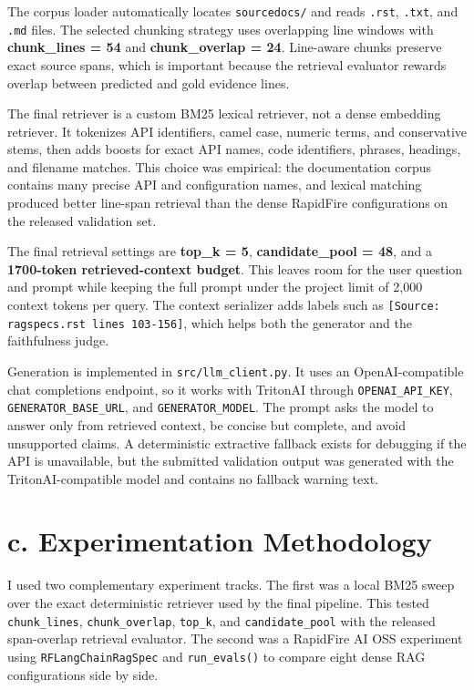\documentclass[11pt,twocolumn]{article}
\newcommand{\code}[1]{\texttt{\footnotesize #1}}
\newcommand{\metric}[1]{\textbf{#1}}
\begin{document}
The corpus loader automatically locates \code{sourcedocs/} and reads \code{.rst}, \code{.txt}, and \code{.md} files. The selected chunking strategy uses overlapping line windows with \metric{chunk\_lines = 54} and \metric{chunk\_overlap = 24}. Line-aware chunks preserve exact source spans, which is important because the retrieval evaluator rewards overlap between predicted and gold evidence lines.

The final retriever is a custom BM25 lexical retriever, not a dense embedding retriever. It tokenizes API identifiers, camel case, numeric terms, and conservative stems, then adds boosts for exact API names, code identifiers, phrases, headings, and filename matches. This choice was empirical: the documentation corpus contains many precise API and configuration names, and lexical matching produced better line-span retrieval than the dense RapidFire configurations on the released validation set.

The final retrieval settings are \metric{top\_k = 5}, \metric{candidate\_pool = 48}, and a \metric{1700-token retrieved-context budget}. This leaves room for the user question and prompt while keeping the full prompt under the project limit of 2,000 context tokens per query. The context serializer adds labels such as \code{[Source: ragspecs.rst lines 103-156]}, which helps both the generator and the faithfulness judge.

Generation is implemented in \code{src/llm\_client.py}. It uses an OpenAI-compatible chat completions endpoint, so it works with TritonAI through \code{OPENAI\_API\_KEY}, \code{GENERATOR\_BASE\_URL}, and \code{GENERATOR\_MODEL}. The prompt asks the model to answer only from retrieved context, be concise but complete, and avoid unsupported claims. A deterministic extractive fallback exists for debugging if the API is unavailable, but the submitted validation output was generated with the TritonAI-compatible model and contains no fallback warning text.

\section{c. Experimentation Methodology}

I used two complementary experiment tracks. The first was a local BM25 sweep over the exact deterministic retriever used by the final pipeline. This tested \code{chunk\_lines}, \code{chunk\_overlap}, \code{top\_k}, and \code{candidate\_pool} with the released span-overlap retrieval evaluator. The second was a RapidFire AI OSS experiment using \code{RFLangChainRagSpec} and \code{run\_evals()} to compare eight dense RAG configurations side by side.
\end{document}
